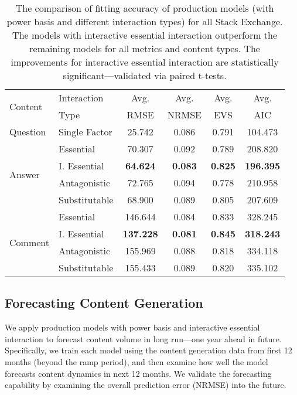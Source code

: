 \begin{table}[ht]
	\vspace{-0.5\baselineskip}
	\caption{The comparison of fitting accuracy of production models (with power basis and different interaction types) for all Stack Exchange. The models with interactive essential interaction outperform the remaining models for all metrics and content types. The improvements for interactive essential interaction are statistically significant---validated via paired t-tests.}
    \vspace{-\baselineskip}
	\label{tbl:model_fit}
	\begin{center}
	\begin{tabular}{llcccc}
    \toprule
    \multirow{2}{*}{Content} & Interaction & Avg. & Avg. & Avg. & Avg.\\
    & Type & RMSE & NRMSE & EVS & AIC\\
    \midrule
    Question & Single Factor & 25.742 & 0.086 & 0.791 & 104.473\\
    \midrule
    \multirow{4}{*}{Answer} & Essential & 70.307 & 0.092 & 0.789 & 208.820\\
    & I. Essential & \textbf{64.624} & \textbf{0.083} & \textbf{0.825} & \textbf{196.395}\\
    & Antagonistic & 72.765 & 0.094 &  0.778 & 210.958\\
    & Substitutable & 68.900 & 0.089 & 0.805 & 207.609\\
    \midrule
    \multirow{4}{*}{Comment} & Essential & 146.644 & 0.084 & 0.833 & 328.245\\
    & I. Essential & \textbf{137.228} & \textbf{0.081} & \textbf{0.845} & \textbf{318.243}\\
    & Antagonistic & 155.969 & 0.088 &  0.818 & 334.118\\
    & Substitutable & 155.433 & 0.089 & 0.820 & 335.102\\
    \bottomrule
	\end{tabular}
	\end{center}
    \vspace{-\baselineskip}
\end{table}

\subsection{Forecasting Content Generation} 
We apply production models with power basis and interactive essential interaction to forecast content volume in long run---one year ahead in future. Specifically, we train each model using the content generation data from first 12 months (beyond the ramp period), and then examine how well the model forecasts content dynamics in next 12 months. We validate the forecasting capability by examining the overall prediction error (NRMSE) into the future. 

